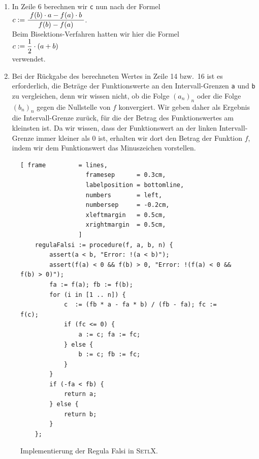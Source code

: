 \begin{enumerate}
\item In Zeile 6 berechnen wir \texttt{c} nun nach der Formel
      \\[0.2cm]
      \hspace*{1.3cm}
      $\displaystyle c := \displaystyle\frac{\;\displaystyle f(b) \cdot a - f(a) \cdot b\;}{\;\displaystyle f(b) - f(a)\;}$. 
      \\[0.2cm]
      Beim Bisektions-Verfahren hatten wir hier die Formel
      \\[0.2cm]
      \hspace*{1.3cm}
      $\displaystyle c := \frac{1}{2} \cdot (a + b)$
      \\[0.2cm]
      verwendet.
\item Bei der R\"uckgabe des berechneten Wertes in Zeile 14 bzw.~16 ist es erforderlich, die Betr\"age der
      Funktionswerte an den Intervall-Grenzen  \texttt{a} und \texttt{b} zu vergleichen, denn wir
      wissen nicht, ob die Folge $(a_n)_n$ oder die Folge $(b_n)_n$ gegen die Nullstelle von $f$
      konvergiert.  Wir geben daher als Ergebnis die 
      Intervall-Grenze  zur\"uck, f\"ur die der Betrag des Funktionswertes am kleinsten ist.
      Da wir wissen, dass der Funktionswert an der linken Intervall-Grenze immer kleiner als 0
      ist, erhalten wir dort den Betrag der Funktion $f$, indem wir dem Funktionswert das Minuszeichen
      vorstellen. 
\end{enumerate}

\begin{figure}[!ht]
  \centering
\begin{Verbatim}[ frame         = lines, 
                  framesep      = 0.3cm, 
                  labelposition = bottomline,
                  numbers       = left,
                  numbersep     = -0.2cm,
                  xleftmargin   = 0.5cm,
                  xrightmargin  = 0.5cm,
                ]
    regulaFalsi := procedure(f, a, b, n) {
        assert(a < b, "Error: !(a < b)");
        assert(f(a) < 0 && f(b) > 0, "Error: !(f(a) < 0 && f(b) > 0)");
        fa := f(a); fb := f(b); 
        for (i in [1 .. n]) {
            c  := (fb * a - fa * b) / (fb - fa); fc := f(c); 
            if (fc <= 0) {
                a := c; fa := fc; 
            } else {
                b := c; fb := fc; 
            }
        }
        if (-fa < fb) {
            return a;
        } else {
            return b;
        }
    };
\end{Verbatim}
\vspace*{-0.3cm}
  \caption{Implementierung der Regula Falsi in \textsc{SetlX}.}
  \label{fig:regulaFalsi.stlx}
\end{figure} %

